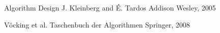 \begin{course}
\begin{literature}
 

Algorithm Design\newline
J. Kleinberg and É. Tardos\newline
Addison Wesley, 2005

 

Vöcking et al.\newline
Taschenbuch der Algorithmen\newline
Springer, 2008

\end{literature}



\end{course}